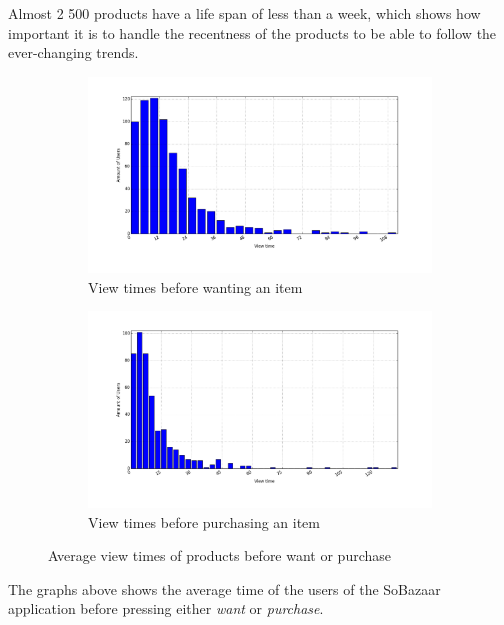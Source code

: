         Almost 2 500 products have a life span of less than a week, which shows how important it is to handle the recentness of the products to be able to follow the ever-changing trends.

    \begin{figure}[H]
        \centering
        \begin{subfigure}{.5\textwidth}
            \centering
            \includegraphics[width=\dualGraphWidth]{image/product_wanteddistribution.png}
            \caption{View times before wanting an item}
    \label{figure:viewWant}
        \end{subfigure}%
        \begin{subfigure}{.5\textwidth}
            \centering
            \includegraphics[width=\dualGraphWidth]{image/product_purchase_intendeddistribution.png}
            \caption{View times before purchasing an item}
    \label{figure:viewBuy}
        \end{subfigure}
        \caption{Average view times of products before want or purchase}
    \end{figure}
        The graphs above shows the average time of the users of the SoBazaar application before pressing either \emph{want} or \emph{purchase}.

